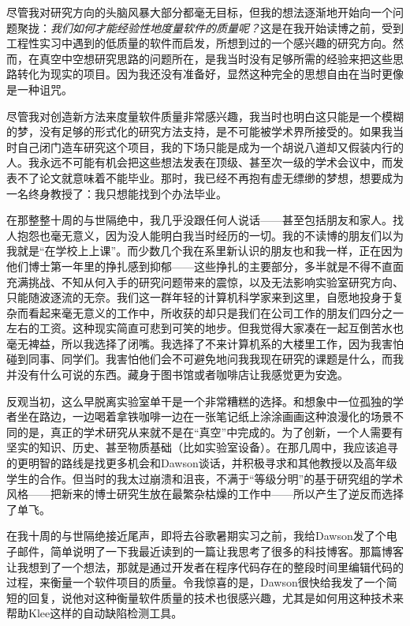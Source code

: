 \documentclass[letter,12pt]{book}
\begin{document}
\begin{CJK}{UTF8}{gbsn}
尽管我对研究方向的头脑风暴大部分都毫无目标，但我的想法逐渐地开始向一个问题聚拢：\emph{我们如何才能经验性地度量软件的质量呢？}这是在我开始读博之前，受到工程性实习中遇到的低质量的软件而启发，所想到过的一个感兴趣的研究方向。然而，在真空中空想研究思路的问题所在，是我当时没有足够所需的经验来把这些思路转化为现实的项目。因为我还没有准备好，显然这种完全的思想自由在当时更像是一种诅咒。

尽管我对创造新方法来度量软件质量非常感兴趣，我当时也明白这只能是一个模糊的梦，没有足够的形式化的研究方法支持，是不可能被学术界所接受的。如果我当时自己闭门造车研究这个项目，我的下场只能是成为一个胡说八道却又假装内行的人。我永远不可能有机会把这些想法发表在顶级、甚至次一级的学术会议中，而发表不了论文就意味着不能毕业。那时，我已经不再抱有虚无缥缈的梦想，想要成为一名终身教授了：我只想能找到个办法毕业。

在那整整十周的与世隔绝中，我几乎没跟任何人说话——甚至包括朋友和家人。找人抱怨也毫无意义，因为没人能明白我当时经历的一切。我的不读博的朋友们以为我就是“在学校上上课”。而少数几个我在系里新认识的朋友也和我一样，正在因为他们博士第一年里的挣扎感到抑郁——这些挣扎的主要部分，多半就是不得不直面充满挑战、不知从何入手的研究问题带来的震惊，以及无法影响实验室研究方向、只能随波逐流的无奈。我们这一群年轻的计算机科学家来到这里，自愿地投身于复杂而看起来毫无意义的工作中，所收获的却只是我们在公司工作的朋友们四分之一左右的工资。这种现实简直可悲到可笑的地步。但我觉得大家凑在一起互倒苦水也毫无裨益，所以我选择了闭嘴。我选择了不来计算机系的大楼里工作，因为我害怕碰到同事、同学们。我害怕他们会不可避免地问我我现在研究的课题是什么，而我并没有什么可说的东西。藏身于图书馆或者咖啡店让我感觉更为安逸。

反观当初，这么早脱离实验室单干是一个非常糟糕的选择。和想象中一位孤独的学者坐在路边，一边喝着拿铁咖啡一边在一张笔记纸上涂涂画画这种浪漫化的场景不同的是，真正的学术研究从来就不是在“真空”中完成的。为了创新，一个人需要有坚实的知识、历史、甚至物质基础（比如实验室设备）。在那几周中，我应该追寻的更明智的路线是找更多机会和Dawson谈话，并积极寻求和其他教授以及高年级学生的合作。但当时的我太过崩溃和沮丧，不满于“等级分明”的基于研究组的学术风格——把新来的博士研究生放在最繁杂枯燥的工作中——所以产生了逆反而选择了单飞。

\breakline

在我十周的与世隔绝接近尾声，即将去谷歌暑期实习之前，我给Dawson发了个电子邮件，简单说明了一下我最近读到的一篇让我思考了很多的科技博客。那篇博客让我想到了一个想法，那就是通过开发者在程序代码存在的整段时间里编辑代码的过程，来衡量一个软件项目的质量。令我惊喜的是，Dawson很快给我发了一个简短的回复，说他对这种衡量软件质量的技术也很感兴趣，尤其是如何用这种技术来帮助Klee这样的自动缺陷检测工具。


\end{CJK}
\end{document}
